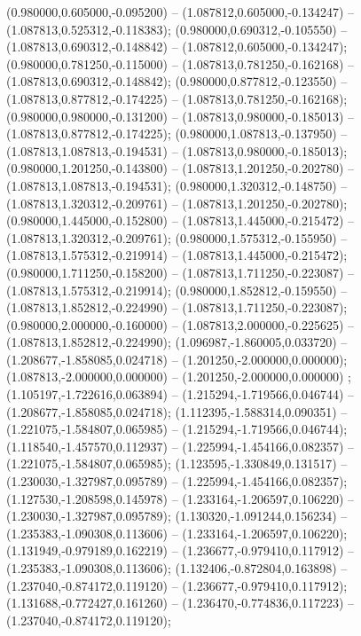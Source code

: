  (0.980000,0.605000,-0.095200) -- (1.087812,0.605000,-0.134247) -- (1.087813,0.525312,-0.118383);
 (0.980000,0.690312,-0.105550) -- (1.087813,0.690312,-0.148842) -- (1.087812,0.605000,-0.134247);
 (0.980000,0.781250,-0.115000) -- (1.087813,0.781250,-0.162168) -- (1.087813,0.690312,-0.148842);
 (0.980000,0.877812,-0.123550) -- (1.087813,0.877812,-0.174225) -- (1.087813,0.781250,-0.162168);
 (0.980000,0.980000,-0.131200) -- (1.087813,0.980000,-0.185013) -- (1.087813,0.877812,-0.174225);
 (0.980000,1.087813,-0.137950) -- (1.087813,1.087813,-0.194531) -- (1.087813,0.980000,-0.185013);
 (0.980000,1.201250,-0.143800) -- (1.087813,1.201250,-0.202780) -- (1.087813,1.087813,-0.194531);
 (0.980000,1.320312,-0.148750) -- (1.087813,1.320312,-0.209761) -- (1.087813,1.201250,-0.202780);
 (0.980000,1.445000,-0.152800) -- (1.087813,1.445000,-0.215472) -- (1.087813,1.320312,-0.209761);
 (0.980000,1.575312,-0.155950) -- (1.087813,1.575312,-0.219914) -- (1.087813,1.445000,-0.215472);
 (0.980000,1.711250,-0.158200) -- (1.087813,1.711250,-0.223087) -- (1.087813,1.575312,-0.219914);
 (0.980000,1.852812,-0.159550) -- (1.087813,1.852812,-0.224990) -- (1.087813,1.711250,-0.223087);
 (0.980000,2.000000,-0.160000) -- (1.087813,2.000000,-0.225625) -- (1.087813,1.852812,-0.224990);
 (1.096987,-1.860005,0.033720) -- (1.208677,-1.858085,0.024718) -- (1.201250,-2.000000,0.000000);
 (1.087813,-2.000000,0.000000) -- (1.201250,-2.000000,0.000000) ;
 (1.105197,-1.722616,0.063894) -- (1.215294,-1.719566,0.046744) -- (1.208677,-1.858085,0.024718);
 (1.112395,-1.588314,0.090351) -- (1.221075,-1.584807,0.065985) -- (1.215294,-1.719566,0.046744);
 (1.118540,-1.457570,0.112937) -- (1.225994,-1.454166,0.082357) -- (1.221075,-1.584807,0.065985);
 (1.123595,-1.330849,0.131517) -- (1.230030,-1.327987,0.095789) -- (1.225994,-1.454166,0.082357);
 (1.127530,-1.208598,0.145978) -- (1.233164,-1.206597,0.106220) -- (1.230030,-1.327987,0.095789);
 (1.130320,-1.091244,0.156234) -- (1.235383,-1.090308,0.113606) -- (1.233164,-1.206597,0.106220);
 (1.131949,-0.979189,0.162219) -- (1.236677,-0.979410,0.117912) -- (1.235383,-1.090308,0.113606);
 (1.132406,-0.872804,0.163898) -- (1.237040,-0.874172,0.119120) -- (1.236677,-0.979410,0.117912);
 (1.131688,-0.772427,0.161260) -- (1.236470,-0.774836,0.117223) -- (1.237040,-0.874172,0.119120);
